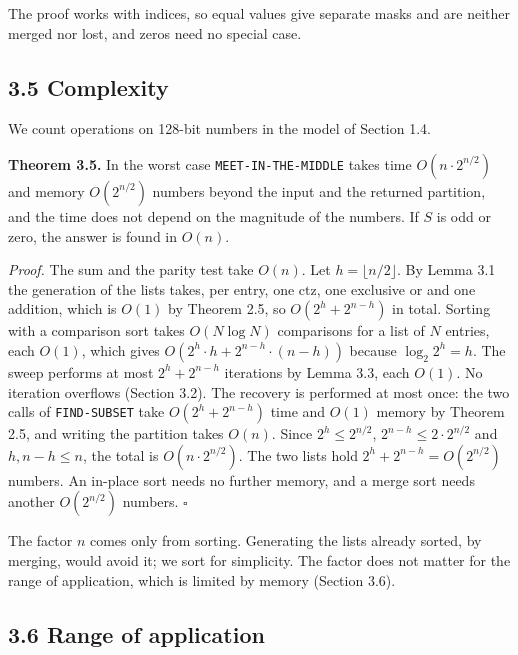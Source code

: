 \documentclass[
]{article}
\begin{document}
The proof works with indices, so equal values give separate masks and
are neither merged nor lost, and zeros need no special case.

\hypertarget{complexity-1}{%
\subsection{3.5 Complexity}\label{complexity-1}}

We count operations on 128-bit numbers in the model of Section 1.4.

\textbf{Theorem 3.5.} In the worst case \texttt{MEET-IN-THE-MIDDLE}
takes time \(O(n \cdot 2^{n/2})\) and memory \(O(2^{n/2})\) numbers
beyond the input and the returned partition, and the time does not
depend on the magnitude of the numbers. If \(S\) is odd or zero, the
answer is found in \(O(n)\).

\emph{Proof.} The sum and the parity test take \(O(n)\). Let
\(h = \lfloor n/2 \rfloor\). By Lemma 3.1 the generation of the lists
takes, per entry, one \(\mathrm{ctz}\), one exclusive or and one
addition, which is \(O(1)\) by Theorem 2.5, so \(O(2^h + 2^{n-h})\) in
total. Sorting with a comparison sort takes \(O(N \log N)\) comparisons
for a list of \(N\) entries, each \(O(1)\), which gives
\(O(2^h \cdot h + 2^{n-h} \cdot (n-h))\) because \(\log_2 2^h = h\). The
sweep performs at most \(2^h + 2^{n-h}\) iterations by Lemma 3.3, each
\(O(1)\). No iteration overflows (Section 3.2). The recovery is
performed at most once: the two calls of \texttt{FIND-SUBSET} take
\(O(2^h + 2^{n-h})\) time and \(O(1)\) memory by Theorem 2.5, and
writing the partition takes \(O(n)\). Since \(2^h \le 2^{n/2}\),
\(2^{n-h} \le 2 \cdot 2^{n/2}\) and \(h, n - h \le n\), the total is
\(O(n \cdot 2^{n/2})\). The two lists hold
\(2^h + 2^{n-h} = O(2^{n/2})\) numbers. An in-place sort needs no
further memory, and a merge sort needs another \(O(2^{n/2})\) numbers.
\(\square\)

The factor \(n\) comes only from sorting. Generating the lists already
sorted, by merging, would avoid it; we sort for simplicity. The factor
does not matter for the range of application, which is limited by memory
(Section 3.6).

\hypertarget{range-of-application-1}{%
\subsection{3.6 Range of application}\label{range-of-application-1}}
\end{document}
